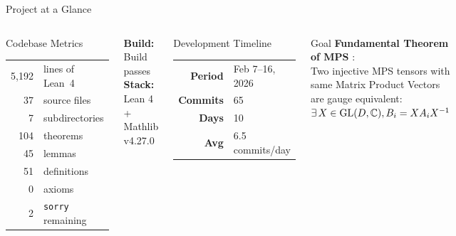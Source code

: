 \documentclass[aspectratio=169,10pt]{beamer}
\begin{document}
\begin{frame}{Project at a Glance}
    \vspace{-0.7em}

    \begin{columns}[T]
        \begin{block}{\small Codebase Metrics}
            {\small
            \begin{tabular}{rl}
                \textcolor{leangreen}{5{,}192} & lines of Lean~4 \\
                \textcolor{leangreen}{37}      & source files \\
                \textcolor{leangreen}{7}       & subdirectories \\
                \textcolor{leangreen}{104}     & theorems \\
                \textcolor{leangreen}{45}      & lemmas \\
                \textcolor{leangreen}{51}      & definitions \\
                \textcolor{leangreen}{0}       & axioms \\
                \textcolor{amber}{2}           & \texttt{sorry} remaining \\
            \end{tabular}
            }
        \end{block}

        \vspace{0.2em}
        {\small\textbf{Build:} \textcolor{leangreen}{\checkmark} Build passes}\\
        {\small\textbf{Stack:} Lean 4 + Mathlib v4.27.0}

        \begin{block}{\small Development Timeline}
            {\small
            \begin{tabular}{rl}
                \textbf{Period}  & Feb 7--16, 2026 \\
                \textbf{Commits} & 65 \\
                \textbf{Days}    & 10 \\
                \textbf{Avg}     & 6.5 commits/day \\
            \end{tabular}
            }
        \end{block}

        \vspace{0.2em}
        \begin{block}{\small Goal}
            {\scriptsize
            \textbf{Fundamental Theorem of MPS} \cite{Perez-Garcia2007Matrix}:\\
            Two injective MPS tensors with same Matrix Product Vectors are gauge equivalent:
            $\exists\, X \in \mathrm{GL}(D,\mathbb{C}),  B_i = X A_i X^{-1}$
            }
        \end{block}
    \end{columns}
\end{frame}
\end{document}

